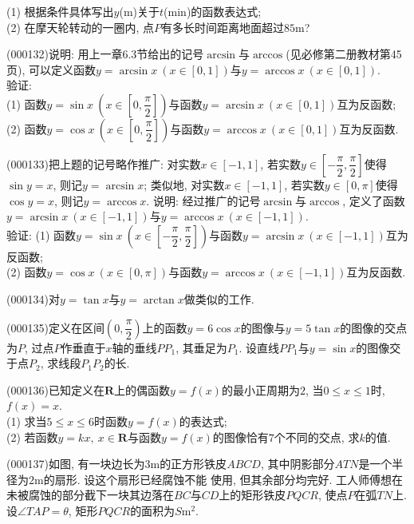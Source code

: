 (1) 根据条件具体写出$y$($\text{m}$)关于$t$($\text{min}$)的函数表达式;\\
(2) 在摩天轮转动的一圈内, 点$P$有多长时间距离地面超过$85\text{m}$?
\item (000132)说明: 用上一章6.3节给出的记号$\arcsin$与$\arccos$(见必修第二册教材第45页), 可以定义函数$y=\arcsin x \ (x\in [0, 1])$与$y=\arccos x \ (x\in [0, 1])$.\\
验证:\\
(1) 函数$y=\sin x\ (x\in [0, \dfrac\pi 2])$与函数$y=\arcsin x \ (x\in [0, 1])$互为反函数;\\
(2) 函数$y=\cos x \ (x\in [0, \dfrac \pi 2])$与函数$y=\arccos x\ (x\in [0, 1])$互为反函数.
\item (000133)把上题的记号略作推广: 对实数$x\in [-1, 1]$, 若实数$y\in [-\dfrac \pi 2, \dfrac\pi 2]$使得$\sin y=x$, 则记$y=\arcsin x$; 类似地, 对实数$x\in [-1, 1]$, 若实数$y\in [0, \pi]$使得$\cos y=x$, 则记$y=\arccos x$. 说明: 经过推广的记号$\arcsin$与$\arccos$, 定义了函数$y=\arcsin x \ (x\in [-1, 1])$与$y=\arccos x \ (x\in [-1, 1])$.\\
验证:
(1) 函数$y=\sin x \ (x\in  [-\dfrac\pi 2, \dfrac\pi 2])$与函数$y=\arcsin x \ (x\in [-1, 1])$互为反函数;\\
(2) 函数$y=\cos x\ (x\in [0, \pi])$与函数$y=\arccos x \ (x\in [-1, 1])$互为反函数.
\item (000134)对$y=\tan x$与$y=\arctan x$做类似的工作.
\item (000135)定义在区间$(0, \dfrac\pi 2)$上的函数$y=6\cos x$的图像与$y=5\tan x$的图像的交点为$P$, 过点$P$作垂直于$x$轴的垂线$PP_1$, 其垂足为$P_1$. 设直线$PP_1$与$y=\sin x$的图像交于点$P_2$, 求线段$P_1P_2$的长.
\item (000136)已知定义在$\mathbf{R}$上的偶函数$y=f(x)$的最小正周期为$2$, 当$0\le x\le 1$时, $f(x)=x$.\\
(1) 求当$5\le x\le 6$时函数$y=f(x)$的表达式;\\
(2) 若函数$y=kx,\ x\in \mathbf{R}$与函数$y=f(x)$的图像恰有$7$个不同的交点, 求$k$的值.
\item (000137)如图, 有一块边长为$3\text{m}$的正方形铁皮$ABCD$, 其中阴影部分$ATN$是一个半径为$2\text{m}$的扇形. 设这个扇形已经腐蚀不能
使用, 但其余部分均完好. 工人师傅想在未被腐蚀的部分截下一块其边落在$BC$与$CD$上的矩形铁皮$PQCR$, 使点$P$在弧$TN$上. 设$\angle TAP=\theta$, 矩形$PQCR$的面积为$S\text{m}^2$.
